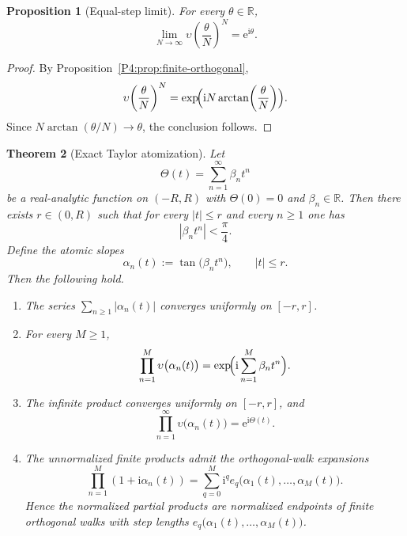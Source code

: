 \documentclass[11pt,a4paper]{article}
\numberwithin{equation}{section}
\newtheorem{theorem}{Theorem}[section]
\newtheorem{proposition}[theorem]{Proposition}
\theoremstyle{definition}
\theoremstyle{remark}
\newcommand{\RR}{\mathbb R}
\newcommand{\e}{\mathrm e}
\newcommand{\ii}{\mathrm i}
\begin{document}
\begin{proposition}[Equal-step limit]\label{P4:prop:equal-step-limit}
For every $\theta\in\RR$,
\[
\lim_{N\to\infty}\upsilon\!\left(\frac{\theta}{N}\right)^N=\e^{\ii\theta}.
\]
\end{proposition}

\begin{proof}
By Proposition~\ref{P4:prop:finite-orthogonal},
\[
\upsilon\!\left(\frac{\theta}{N}\right)^N
=\exp\!\Bigl(\ii N\arctan\!\left(\frac{\theta}{N}\right)\Bigr).
\]
Since $N\arctan(\theta/N)\to \theta$, the conclusion follows.
\end{proof}

\begin{theorem}[Exact Taylor atomization]\label{P4:thm:taylor-atomization}
Let
\[
\Theta(t)=\sum_{n=1}^{\infty}\beta_n t^n
\]
be a real-analytic function on $(-R,R)$ with $\Theta(0)=0$ and $\beta_n\in\RR$.  Then there exists $r\in(0,R)$ such that for every $|t|\le r$ and every $n\ge1$ one has
\[
|\beta_n t^n|<\frac{\pi}{4}.
\]
Define the atomic slopes
\[
\alpha_n(t):=\tan\bigl(\beta_n t^n\bigr),\qquad |t|\le r.
\]
Then the following hold.
\begin{enumerate}[label=(\roman*)]
\item The series $\sum_{n\ge1}|\alpha_n(t)|$ converges uniformly on $[-r,r]$.
\item For every $M\ge1$,
\[
\prod_{n=1}^M \upsilon\bigl(\alpha_n(t)\bigr)=\exp\!\Bigl(\ii\sum_{n=1}^M\beta_n t^n\Bigr).
\]
\item The infinite product converges uniformly on $[-r,r]$, and
\[
\prod_{n=1}^{\infty}\upsilon\bigl(\alpha_n(t)\bigr)=\e^{\ii\Theta(t)}.
\]
\item The unnormalized finite products admit the orthogonal-walk expansions
\[
\prod_{n=1}^M (1+\ii\alpha_n(t))=
\sum_{q=0}^M \ii^q e_q\bigl(\alpha_1(t),\dots,\alpha_M(t)\bigr).
\]
Hence the normalized partial products are normalized endpoints of finite orthogonal walks with step lengths $e_q\bigl(\alpha_1(t),\dots,\alpha_M(t)\bigr)$.
\end{enumerate}
\end{theorem}
\end{document}
